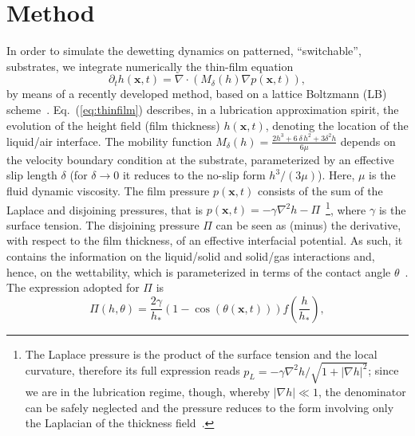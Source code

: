 \section{Method} 
In order to simulate the dewetting dynamics on patterned, ``switchable'', substrates, we integrate numerically the thin-film equation~\cite{reynoldsTheoryLubricationIts1886,oronLongscaleEvolutionThin1997,crasterDynamicsStabilityThin2009} 
\begin{equation}\label{eq:thinfilm}
    \partial_t h(\mathbf{x},t) = \nabla\cdot\left(M_{\delta}(h)\nabla p(\mathbf{x},t)\right),
\end{equation}
by means of a recently developed method, based on a lattice Boltzmann (LB) scheme~\cite{zitzLatticeBoltzmannMethod2019,zitzLatticeBoltzmannSimulations2021, zitzSwalbeJlLattice2022}.
Eq.~(\ref{eq:thinfilm}) describes, in a lubrication approximation spirit, the evolution of the height field (film thickness) $h(\mathbf{x},t)$, denoting the location of the liquid/air interface. 
The mobility function $M_{\delta}(h) = \frac{2h^3 + 6\,\delta\, h^2 + 3\delta^2h}{6\mu}$ depends on the velocity boundary condition at the substrate, parameterized by an effective slip length $\delta$ (for $\delta \rightarrow 0$ it reduces to the no-slip form $h^3/(3\mu)$). 
Here, $\mu$ is the fluid dynamic viscosity.
The film pressure $p(\mathbf{x},t)$ consists of the sum of the Laplace and disjoining pressures, that is $p(\mathbf{x},t) = -\gamma \nabla^2 h - \Pi$~\footnote{The Laplace pressure is the product of the surface tension and the local curvature, therefore its full expression reads $p_L = -\gamma \nabla^2 h/\sqrt{1+|\nabla h|^2}$; since we are in the lubrication regime, though, whereby $|\nabla h| \ll 1$, the denominator can be safely neglected and the pressure reduces to the form involving only the Laplacian of the thickness field~\cite{benetDisjoiningPressureHealing2014,pahlavanThinFilmsPartial2018}.}, 
where $\gamma$ is the surface tension.
The disjoining pressure $\Pi$ can be seen as (minus) the derivative, with respect to the film thickness, of an effective interfacial potential.
As such, it contains the information on the liquid/solid and solid/gas interactions and, hence, on the wettability, which is parameterized in terms of the contact angle $\theta$~\cite{bonnWettingSpreading2009, schwartzSimulationDropletMotion1998}. 
The expression adopted for $\Pi$ is
\begin{equation}\label{eq:disjoinpressure}
  \Pi(h,\theta) = \frac{2\gamma}{h_{\ast}}(1-\cos(\theta(\mathbf{x},t)))
  f\left(\frac{h}{h_{\ast}}\right),
\end{equation}
